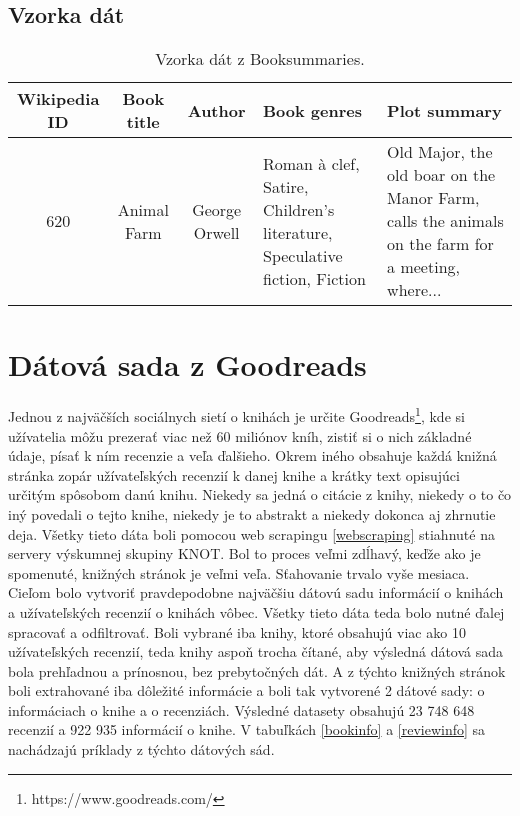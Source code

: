\subsection*{Vzorka dát}

\begin{table}[hbt]
\centering
\caption{Vzorka dát z Booksummaries.}
\label{booksummaries}
\begin{tabular}{|c|c|c|
>{\centering\arraybackslash}m{7em}|
>{\centering\arraybackslash}m{7em}|}
\hline
Wikipedia ID & Book title & Author & Book genres & Plot summary \\
\hline
620 & Animal Farm & George Orwell & Roman à clef, Satire, Children's literature, Speculative fiction, Fiction &  Old Major, the old boar on the Manor Farm, calls the animals on the farm for a meeting, where...\\ 
\hline

\end{tabular}
\end{table}

\section{Dátová sada z Goodreads} \label{goodreadsdata}

Jednou z najväčších sociálnych sietí o knihách je určite Goodreads\footnote{https://www.goodreads.com/}, kde si užívatelia môžu prezerať viac než 60 miliónov kníh, zistiť si o nich základné údaje, písať k ním recenzie a veľa ďalšieho. Okrem iného obsahuje každá knižná stránka zopár užívateľských recenzií k danej knihe a krátky text opisujúci určitým spôsobom danú knihu. Niekedy sa jedná o citácie z knihy, niekedy o to čo iný povedali o tejto knihe, niekedy je to abstrakt a niekedy dokonca aj zhrnutie deja. Všetky tieto dáta boli pomocou web scrapingu \ref{webscraping} stiahnuté na servery výskumnej skupiny KNOT. Bol to proces veľmi zdĺhavý, keďže ako je spomenuté, knižných stránok je veľmi veľa. Sťahovanie trvalo vyše mesiaca. Cieľom bolo vytvoriť pravdepodobne najväčšiu dátovú sadu informácií o knihách a užívateľských recenzií o knihách vôbec. Všetky tieto dáta teda bolo nutné ďalej spracovať a odfiltrovať. Boli vybrané iba knihy, ktoré obsahujú viac ako 10 užívateľských recenzií, teda knihy aspoň trocha čítané, aby výsledná dátová sada bola prehľadnou a prínosnou, bez prebytočných dát. A z týchto knižných stránok boli extrahované iba dôležité informácie a boli tak vytvorené 2 dátové sady: o informáciach o knihe a o recenziách. Výsledné datasety obsahujú 23 748 648 recenzií a 922 935 informácií o knihe. V tabuľkách 
\ref{bookinfo} a \ref{reviewinfo} sa nachádzajú príklady z týchto dátových sád.

